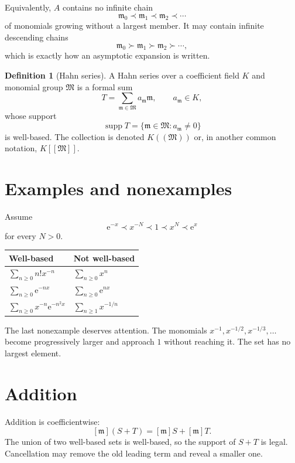 \documentclass[11pt,oneside]{book}
\theoremstyle{definition}
\newtheorem{definition}[theorem]{Definition}
\theoremstyle{remark}
\newcommand{\M}{\mathfrak{M}}
\newcommand{\m}{\mathfrak{m}}
\newcommand{\supp}{\operatorname{supp}}
\newcommand{\e}{\mathrm{e}}
\newcommand{\precdom}{\prec}
\newcommand{\succdom}{\succ}
\begin{document}
Equivalently, $A$ contains no infinite chain
\[
  \m_0\precdom\m_1\precdom\m_2\precdom\cdots
\]
of monomials growing without a largest member. It may contain infinite
descending chains
\[
  \m_0\succdom\m_1\succdom\m_2\succdom\cdots,
\]
which is exactly how an asymptotic expansion is written.

\begin{definition}[Hahn series]
A Hahn series over a coefficient field $K$ and monomial group $\M$ is a formal
sum
\[
  T=\sum_{\m\in\M}a_{\m}\m,
  \qquad a_{\m}\in K,
\]
whose support
\[
  \supp T=\{\m\in\M:a_{\m}\ne0\}
\]
is well-based. The collection is denoted $K((\M))$ or, in another common
notation, $K[[\M]]$.
\end{definition}

\section{Examples and nonexamples}

Assume
\[
  \e^{-x}\precdom x^{-N}\precdom1\precdom x^N\precdom\e^x
\]
for every $N>0$.

\begin{center}
\begin{tabularx}{0.94\textwidth}{@{}X X@{}}
\toprule
\textbf{Well-based} & \textbf{Not well-based}\\
\midrule
$\displaystyle\sum_{n\ge0}n!x^{-n}$ &
$\displaystyle\sum_{n\ge0}x^n$\\[0.7em]
$\displaystyle\sum_{n\ge0}\e^{-nx}$ &
$\displaystyle\sum_{n\ge0}\e^{nx}$\\[0.7em]
$\displaystyle\sum_{n\ge0}x^{-n}\e^{-n^2x}$ &
$\displaystyle\sum_{n\ge1}x^{-1/n}$\\[0.7em]
\bottomrule
\end{tabularx}
\end{center}

The last nonexample deserves attention. The monomials
$x^{-1},x^{-1/2},x^{-1/3},\ldots$ become progressively larger and approach $1$
without reaching it. The set has no largest element.

\section{Addition}

Addition is coefficientwise:
\[
  [\m](S+T)=[\m]S+[\m]T.
\]
The union of two well-based sets is well-based, so the support of $S+T$ is
legal. Cancellation may remove the old leading term and reveal a smaller one.
\end{document}
